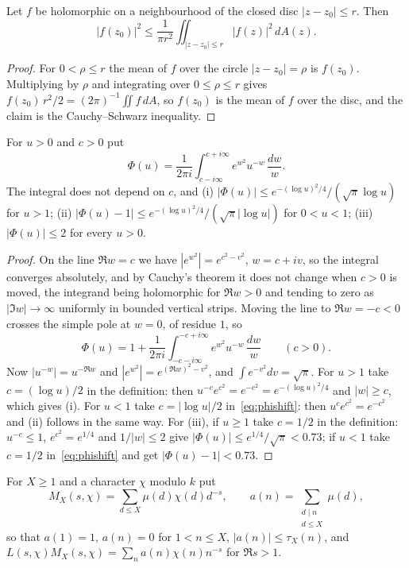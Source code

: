 \begin{lemma}\label{lem:areamean}
Let $f$ be holomorphic on a neighbourhood of the closed disc $|z-z_0|\le r$. Then
\[
  |f(z_0)|^2\le\frac1{\pi r^2}\iint_{|z-z_0|\le r}|f(z)|^2\,dA(z).
\]
\end{lemma}

\begin{proof}
For $0<\rho\le r$ the mean of $f$ over the circle $|z-z_0|=\rho$ is $f(z_0)$. Multiplying by $\rho$ and integrating over $0\le\rho\le r$ gives $f(z_0)\,r^2/2=(2\pi)^{-1}\iint f\,dA$, so $f(z_0)$ is the mean of $f$ over the disc, and the claim is the Cauchy--Schwarz inequality.
\end{proof}

\begin{lemma}\label{lem:kernel}
For $u>0$ and $c>0$ put
\[
  \Phi(u)=\frac1{2\pi i}\int_{c-i\infty}^{c+i\infty}e^{w^2}u^{-w}\,\frac{dw}w .
\]
The integral does not depend on $c$, and
(i) $|\Phi(u)|\le e^{-(\log u)^2/4}/(\sqrt\pi\log u)$ for $u>1$;
(ii) $|\Phi(u)-1|\le e^{-(\log u)^2/4}/(\sqrt\pi|\log u|)$ for $0<u<1$;
(iii) $|\Phi(u)|\le2$ for every $u>0$.
\end{lemma}

\begin{proof}
On the line $\Re w=c$ we have $|e^{w^2}|=e^{c^2-v^2}$, $w=c+iv$, so the integral converges absolutely, and by Cauchy's theorem it does not change when $c>0$ is moved, the integrand being holomorphic for $\Re w>0$ and tending to zero as $|\Im w|\to\infty$ uniformly in bounded vertical strips. Moving the line to $\Re w=-c<0$ crosses the simple pole at $w=0$, of residue $1$, so
\begin{equation}\label{eq:phishift}
  \Phi(u)=1+\frac1{2\pi i}\int_{-c-i\infty}^{-c+i\infty}e^{w^2}u^{-w}\,\frac{dw}w\qquad(c>0).
\end{equation}
Now $|u^{-w}|=u^{-\Re w}$ and $|e^{w^2}|=e^{(\Re w)^2-v^2}$, and $\int e^{-v^2}dv=\sqrt\pi$. For $u>1$ take $c=(\log u)/2$ in the definition: then $u^{-c}e^{c^2}=e^{-c^2}=e^{-(\log u)^2/4}$ and $|w|\ge c$, which gives (i). For $u<1$ take $c=|\log u|/2$ in~\eqref{eq:phishift}: then $u^{c}e^{c^2}=e^{-c^2}$ and (ii) follows in the same way. For (iii), if $u\ge1$ take $c=1/2$ in the definition: $u^{-c}\le1$, $e^{c^2}=e^{1/4}$ and $1/|w|\le2$ give $|\Phi(u)|\le e^{1/4}/\sqrt\pi<0.73$; if $u<1$ take $c=1/2$ in~\eqref{eq:phishift} and get $|\Phi(u)-1|<0.73$.
\end{proof}

For $X\ge1$ and a character $\chi$ modulo $k$ put
\[
  M_X(s,\chi)=\sum_{d\le X}\mu(d)\chi(d)d^{-s},\qquad a(n)=\sum_{\substack{d\mid n\\ d\le X}}\mu(d),
\]
so that $a(1)=1$, $a(n)=0$ for $1<n\le X$, $|a(n)|\le\tau_X(n)$, and $L(s,\chi)M_X(s,\chi)=\sum_na(n)\chi(n)n^{-s}$ for $\Re s>1$.

